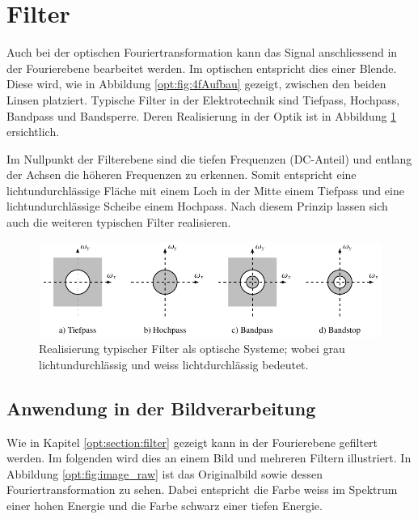 %
%
%
%
\section{Filter
\label{opt:section:filter}}

Auch bei der optischen Fouriertransformation kann das Signal anschliessend in der Fourierebene bearbeitet werden.
Im optischen entspricht dies einer Blende.
Diese wird, wie in Abbildung \ref{opt:fig:4fAufbau} gezeigt, zwischen den beiden Linsen platziert.
Typische Filter in der Elektrotechnik sind Tiefpass, Hochpass, Bandpass und Bandsperre.
Deren Realisierung in der Optik ist in Abbildung \ref{opt:fig:filterarten} ersichtlich.

Im Nullpunkt der Filterebene sind die tiefen Frequenzen (DC-Anteil) und entlang der Achsen die höheren Frequenzen zu erkennen.
Somit entspricht eine lichtundurchlässige Fläche mit einem Loch in der Mitte einem Tiefpass und eine lichtundurchlässige Scheibe einem Hochpass.
Nach diesem Prinzip lassen sich auch die weiteren typischen Filter realisieren.

\begin{figure}
    \centering
    \includegraphics[width=\textwidth]{papers/opt/images/filterarten.pdf}

    \caption{Realisierung typischer Filter als optische Systeme;
        wobei grau lichtundurchlässig und weiss lichtdurchlässig bedeutet.}
    \label{opt:fig:filterarten}
\end{figure}

\subsection{Anwendung in der Bildverarbeitung}
\label{opt:section:image_processing}

Wie in Kapitel \ref{opt:section:filter} gezeigt kann in der Fourierebene gefiltert werden.
Im folgenden wird dies an einem Bild und mehreren Filtern illustriert.
In Abbildung \ref{opt:fig:image_raw} ist das Originalbild sowie dessen Fouriertransformation zu sehen.
Dabei entspricht die Farbe weiss im Spektrum einer hohen Energie und die Farbe schwarz einer tiefen Energie.


